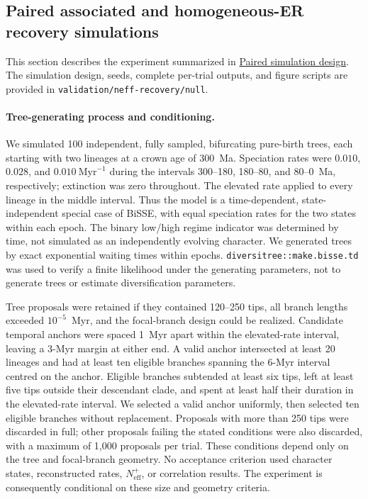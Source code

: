 \subsection*{Paired associated and homogeneous-ER recovery simulations}
\label{sec:paired-neff-supplement}

This section describes the experiment summarized in
\hyperref[sec:paired-neff-main]{Paired simulation design}.
The simulation design, seeds, complete per-trial outputs, and figure scripts
are provided in \texttt{validation/}\allowbreak\texttt{neff-recovery/null}.

\paragraph{Tree-generating process and conditioning.}
We simulated 100 independent, fully sampled, bifurcating pure-birth trees,
each starting with two lineages at a crown age of 300~Ma. Speciation rates
were $0.010$, $0.028$, and $0.010~\mathrm{Myr}^{-1}$ during the intervals
300--180, 180--80, and 80--0~Ma, respectively; extinction was zero throughout.
The elevated rate applied to every lineage in the middle interval.
Thus the model is a time-dependent, state-independent special case of BiSSE,
with equal speciation rates for the two states within each epoch. The binary
low/high regime indicator was determined by time, not simulated as an
independently evolving character. We generated trees by exact exponential
waiting times within epochs. \texttt{diversitree::make.bisse.td} was used to
verify a finite likelihood under the generating parameters, not to generate
trees or estimate diversification parameters.

Tree proposals were retained if they contained 120--250 tips, all branch
lengths exceeded $10^{-5}$~Myr, and the focal-branch design could be realized.
Candidate temporal anchors were spaced 1~Myr apart within the elevated-rate
interval, leaving a 3-Myr margin at either end. A valid anchor intersected
at least 20 lineages and had at least ten eligible branches spanning the
6-Myr interval centred on the anchor. Eligible branches subtended at least
six tips, left at least five tips outside their descendant clade, and spent
at least half their duration in the elevated-rate interval. We selected a
valid anchor uniformly, then selected ten eligible branches without
replacement. Proposals with more than 250 tips were discarded in full;
other proposals failing the stated conditions were also discarded, with a
maximum of 1,000 proposals per trial. These conditions depend only on the
tree and focal-branch geometry. No acceptance criterion used character
states, reconstructed rates, $N_{\mathrm{eff}}^{+}$, or correlation results.
The experiment is consequently conditional on these size and geometry criteria.

